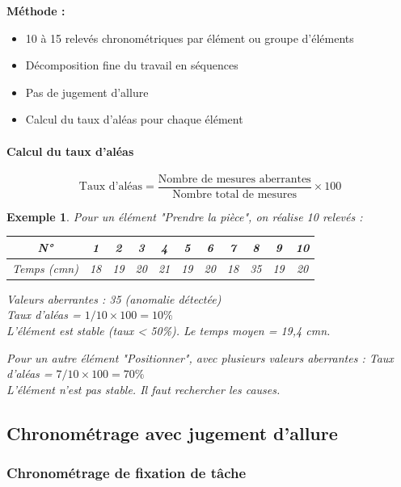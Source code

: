 \documentclass[a4paper,12pt]{article}
\newtheorem{exemple}{Exemple}[section]
\begin{document}
\textbf{Méthode :}
\begin{itemize}
    \item 10 à 15 relevés chronométriques par élément ou groupe d'éléments
    \item Décomposition fine du travail en séquences
    \item Pas de jugement d'allure
    \item Calcul du taux d'aléas pour chaque élément
\end{itemize}

\paragraph{Calcul du taux d'aléas}

\[
\text{Taux d'aléas} = \frac{\text{Nombre de mesures aberrantes}}{\text{Nombre total de mesures}} \times 100
\]

\begin{exemple}
Pour un élément "Prendre la pièce", on réalise 10 relevés :

\begin{center}
\begin{tabular}{|c|c|c|c|c|c|c|c|c|c|c|}
\hline
N° & 1 & 2 & 3 & 4 & 5 & 6 & 7 & 8 & 9 & 10 \\
\hline
Temps (cmn) & 18 & 19 & 20 & 21 & 19 & 20 & 18 & 35 & 19 & 20 \\
\hline
\end{tabular}
\end{center}

Valeurs aberrantes : 35 (anomalie détectée) \\
Taux d'aléas = $1/10 \times 100 = 10\%$ \\
L'élément est stable (taux < 50\%). Le temps moyen = 19,4 cmn.

Pour un autre élément "Positionner", avec plusieurs valeurs aberrantes :
Taux d'aléas = $7/10 \times 100 = 70\%$ \\
L'élément n'est pas stable. Il faut rechercher les causes.
\end{exemple}

\subsection{Chronométrage avec jugement d'allure}

\subsubsection{Chronométrage de fixation de tâche}
\end{document}
